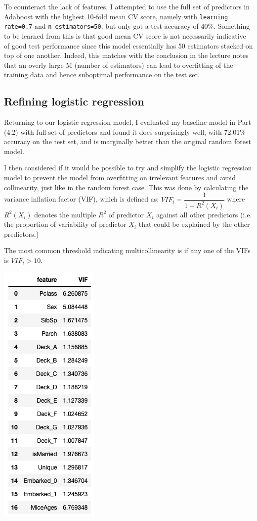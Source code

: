 \documentclass[12pt]{article}
\begin{document}
To counteract the lack of features, I attempted to use the full set of predictors in Adaboost with the highest 10-fold mean CV score, namely with \texttt{learning rate=0.7} and \texttt{n\_estimators=50}, but only got a test accuracy of 40\%. Something to be learned from this is that good mean CV score is not necessarily indicative of good test performance since this model essentially has 50 estimators stacked on top of one another. Indeed, this matches with the conclusion in the lecture notes that an overly large M (number of estimators) can lead to overfitting of the training data and hence suboptimal performance on the test set.\newline

\subsection{Refining logistic regression}

Returning to our logistic regression model, I evaluated my baseline model in Part (4.2) with full set of predictors and found it does surprisingly well, with 72.01\% accuracy on the test set, and is marginally better than the original random forest model.\newline

I then considered if it would be possible to try and simplify the logistic regression model to prevent the model from overfitting on irrelevant features and avoid collinearity, just like in the random forest case. This was done by calculating the variance inflation factor (VIF), which is defined as: $VIF_{i}=\dfrac{1}{1-R^{2}(X_i)}$ where $R^{2}(X_i)$ denotes the multiple $R^2$ of predictor $X_i$ against all other predictors (i.e. the proportion of variability of predictor $X_i$ that could be explained by the other predictors.)\newline

The most common threshold indicating multicollinearity is if any one of the VIFs is $VIF_{i}>10$.\newline

\includegraphics[scale=0.4]{vif}
\end{document}

